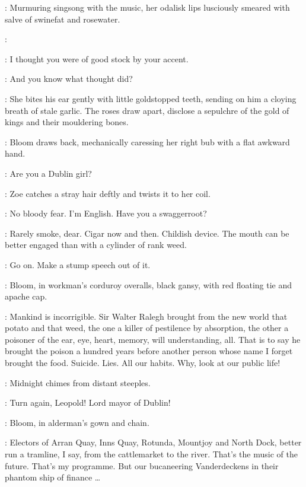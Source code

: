 :
Murmuring singsong with the music,
her odalisk lips lusciously
smeared with salve of swinefat and rosewater.

\Zoe:

\Bloom:
I thought you were of good stock by your accent.

\Zoe:
And you know what thought did?

:
She bites his ear gently with little goldstopped teeth,
sending on him a cloying breath of stale garlic.
The roses draw apart,
disclose a sepulchre of the gold of kings
and their mouldering bones.

:
Bloom draws back,
mechanically caressing her right bub with a flat awkward hand.

\Bloom:
Are you a Dublin girl?

:
Zoe catches a stray hair deftly and twists it to her coil.

\Zoe:
No bloody fear.
I'm English.
Have you a swaggerroot?

\Bloom:
Rarely smoke,
dear.
Cigar now and then.
Childish device.
The mouth can be better engaged than with a cylinder of rank weed.

\Zoe:
Go on.
Make a stump speech out of it.


\par

:
Bloom,
in workman's corduroy overalls,
black gansy,
with red floating tie and apache cap.

\Bloom:
Mankind is incorrigible.
Sir Walter Ralegh brought from the new world that potato and that weed,
the one a killer of pestilence by absorption,
the other a poisoner of the ear,
eye,
heart,
memory,
will understanding,
all.
That is to say he brought the poison a hundred years
before another person whose name I forget brought the food.
Suicide.
Lies.
All our habits.
Why,
look at our public life!

:
Midnight chimes from distant steeples.

\Chimes:
Turn again,
Leopold!
Lord mayor of Dublin!

:
Bloom,
in alderman's gown and chain.

\Bloom:
Electors of Arran Quay,
Inns Quay,
Rotunda,
Mountjoy and North Dock,
better run a tramline,
I say,
from the cattlemarket to the river.
That's the music of the future.
That's my programme.
But our bucaneering Vanderdeckens in their phantom ship of finance \ldots%

